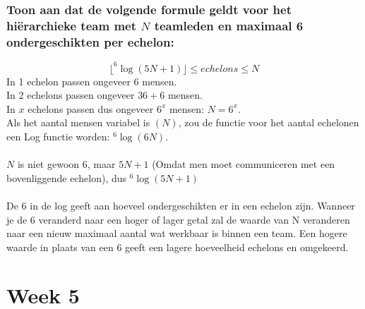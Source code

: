 \documentclass[a4paper,titlepage]{artikel1}
\begin{document}
   \subsubsection[Opdracht 4]{Toon aan dat de volgende formule geldt voor het hi\"{e}rarchieke team met $N$ teamleden en maximaal 6 ondergeschikten per echelon:}
   \begin{displaymath}
     \lfloor^6\log{(5N+1)}\rfloor\leq echelons\leq N
   \end{displaymath}
   In 1 echelon passen ongeveer 6 mensen.\\
   In 2 echelons passen ongeveer $36+6$ mensen.\\
   In $x$ echelons passen dus ongeveer $6^x$ mensen: $N=6^x$. \\
   Als het aantal mensen variabel is $(N)$, zou de functie voor het aantal echelonen een Log functie worden: $^6\log{(6N)}$. \\ \\
   $N$ is niet gewoon 6, maar $5N+1$ (Omdat men moet communiceren met een bovenliggende echelon), dus $^6\log{(5N+1)}$ \\ \\
   De 6 in de log geeft aan hoeveel ondergeschikten er in een echelon zijn. Wanneer je de 6 veranderd naar een hoger of lager getal zal de waarde van N veranderen naar een nieuw maximaal aantal wat werkbaar is binnen een team. Een hogere waarde in plaats van een 6 geeft een lagere hoeveelheid echelons en omgekeerd.
   \section{Week 5}
\end{document}
